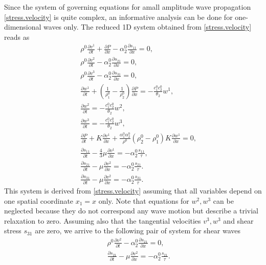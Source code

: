 \documentclass[3p,times]{elsarticle}
\begin{document}
Since the system of governing equations for amall amplitude wave propagation  \eqref{stress.velocity} is quite complex, an informative analysis can be done for one-dimensional waves only. The reduced 1D system obtained from \eqref{stress.velocity} reads as  
\begin{eqnarray} \label{stress.velocity1D}
&&\rho^0\frac{\partial v^1}{\partial t}+\frac{\partial P}{\partial x}-
\alpha_2^0\frac{\partial s_{11}}{\partial x} = 0, \nonumber \\
&&\rho^0\frac{\partial v^2}{\partial t}-\alpha_2^0\frac{\partial s_{21}}{\partial x} = 0, \nonumber \\
&&\rho^0\frac{\partial v^3}{\partial t}-\alpha_2^0\frac{\partial s_{31}}{\partial x} = 0, \nonumber \\
&&\frac{\partial w^1}{\partial t}+\left( \frac{1}{\rho_1^0}-\frac{1}{\rho_2^0}\right)\frac{\partial P}{\partial x}=
-\frac{c_1^0c_2^0}{\theta_2}w^1,  \nonumber \\
&&\frac{\partial w^2}{\partial t}= -\frac{c_1^0c_2^0}{\theta_2}w^2, \\ 
&&\frac{\partial w^3}{\partial t}= -\frac{c_1^0c_2^0}{\theta_2}w^3, \nonumber \\
&&\frac{\partial P}{\partial t}+K\frac{\partial v^1}{\partial x}
+\frac{\alpha_1^0\alpha_2^0}{\rho^0}\left(\rho_2^0-\rho_1^0\right)K\frac{\partial w^1}{\partial x} = 0, \nonumber \\
&&\frac{\partial s_{11}}{\partial t} - 
\frac{4}{3}\mu\frac{\partial v^1}{\partial x} = - \alpha_2^0 \frac{s_{11}}{\tau}, \nonumber \\
&&\frac{\partial s_{21}}{\partial t} - 
\mu\frac{\partial v^2}{\partial x}  = 
- \alpha_2^0 \frac{s_{21}}{\tau}. \nonumber \\
&&\frac{\partial s_{31}}{\partial t} - 
\mu\frac{\partial v^2}{\partial x}  = 
- \alpha_2^0 \frac{s_{31}}{\tau}. \nonumber
\end{eqnarray}
This system is derived from \eqref{stress.velocity} assuming that all variables depend on  one spatial coordinate $x_1=x$ only. Note that equations for $w^2, w^3$ can be neglected because they do not correspond any wave motion but describe a trivial relaxation to zero. Assuming also that the tangential velocities $v^3, w^3$ and shear stress $s_{31}$ are zero, we arrive to the following pair of system for shear waves
\begin{eqnarray} \label{shear.wave}
&&\rho^0\frac{\partial v^2}{\partial t}-\alpha_2^0\frac{\partial s_{21}}{\partial x} = 0, \nonumber \\
&&\frac{\partial s_{21}}{\partial t} - 
\mu\frac{\partial v^2}{\partial x}  = 
- \alpha_2^0 \frac{s_{21}}{\tau}. 
\end{eqnarray}
\end{document}
